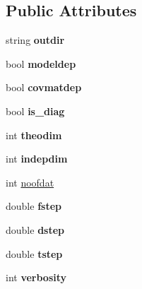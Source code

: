\subsection*{Public Attributes}
\begin{DoxyCompactItemize}
\item 
\hypertarget{classDaliBase_a85702051649d311856fe82ea32b1c7f1}{string {\bfseries outdir}}\label{classDaliBase_a85702051649d311856fe82ea32b1c7f1}

\item 
\hypertarget{classDaliBase_a0985d1e2f659e549ca34196015c75cb5}{bool {\bfseries modeldep}}\label{classDaliBase_a0985d1e2f659e549ca34196015c75cb5}

\item 
\hypertarget{classDaliBase_aa968c6982295a041de7106219a3c1ba3}{bool {\bfseries covmatdep}}\label{classDaliBase_aa968c6982295a041de7106219a3c1ba3}

\item 
\hypertarget{classDaliBase_a83a7d058afbf37e695915cb8782b2df3}{bool {\bfseries is\-\_\-diag}}\label{classDaliBase_a83a7d058afbf37e695915cb8782b2df3}

\item 
\hypertarget{classDaliBase_a9dc741756fbf9b438fcef52ba7ae2cd0}{int {\bfseries theodim}}\label{classDaliBase_a9dc741756fbf9b438fcef52ba7ae2cd0}

\item 
\hypertarget{classDaliBase_a191cbbcaaeb7ec14c1fe8bf4f7646e22}{int {\bfseries indepdim}}\label{classDaliBase_a191cbbcaaeb7ec14c1fe8bf4f7646e22}

\item 
int \hyperlink{classDaliBase_abbecb7f25a3040e674377cd9915f1183}{noofdat}
\item 
\hypertarget{classDaliBase_a18d2259363ec995e590a6ae96dee296a}{double {\bfseries fstep}}\label{classDaliBase_a18d2259363ec995e590a6ae96dee296a}

\item 
\hypertarget{classDaliBase_aabcb7e312a672ccc6f294934159f8fe4}{double {\bfseries dstep}}\label{classDaliBase_aabcb7e312a672ccc6f294934159f8fe4}

\item 
\hypertarget{classDaliBase_aa435a0b2ecdc1f9de7dd73705e22d610}{double {\bfseries tstep}}\label{classDaliBase_aa435a0b2ecdc1f9de7dd73705e22d610}

\item 
\hypertarget{classDaliBase_a2730078ea381c17ba37922b1c19ea7ec}{int {\bfseries verbosity}}\label{classDaliBase_a2730078ea381c17ba37922b1c19ea7ec}


\end{DoxyCompactItemize}
